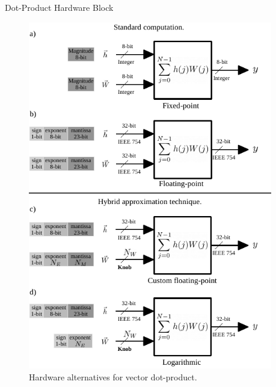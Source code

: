 \documentclass[final]{beamer}
\newlength{\onecolwid}
\newlength{\twocolwid}
\begin{document}
\begin{frame}[t]
\begin{columns}[t]
\begin{column}{\twocolwid}
\begin{columns}[t,totalwidth=\twocolwid]
\begin{column}{\onecolwid}
\begin{block}{Dot-Product Hardware Block}

\begin{figure}
	\includegraphics[width=\linewidth]{../figures/dot-product_unit.pdf}
	\caption{Hardware alternatives for vector dot-product.}
	\label{fig:dot_product_unit}
\end{figure}

\end{block}


\end{column} %

\begin{column}{\onecolwid}\vspace{-.6in} %


\end{column}
\end{columns}
\end{column}
\end{columns}
\end{frame}
\end{document}
